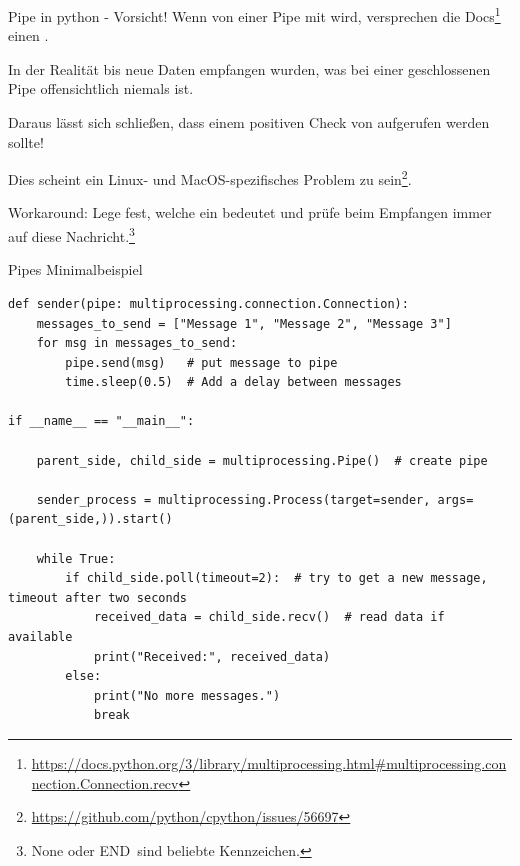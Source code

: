 \documentclass[12pt, aspectratio=169, usepdftitle=false, handout]{beamer}
\newcommand{\pp}[1]{\lpl{#1}}
\newcommand{\furl}[1]{\footnote{\url{#1}}}
\begin{document}
\begin{frame}[fragile]{Pipe in python - Vorsicht!}
	Wenn von einer  Pipe mit \pp{recv}  wird, versprechen die Docs\furl{https://docs.python.org/3/library/multiprocessing.html\#multiprocessing.connection.Connection.recv} einen \pp{EOFError}.
	
	\medskip
	
	In der Realität  \pp{recv} bis neue Daten empfangen wurden, was bei einer geschlossenen Pipe offensichtlich niemals ist.
	
	\medskip
	
	Daraus lässt sich schließen, dass \pp{recv}  einem positiven Check von  aufgerufen werden sollte!
	
	\medskip
	
	Dies scheint ein Linux- und MacOS-spezifisches Problem zu sein\furl{https://github.com/python/cpython/issues/56697}. 
	
	\medskip
	
	Workaround: Lege fest, welche  ein  bedeutet und prüfe beim Empfangen immer auf diese Nachricht.\footnote{None oder \glqq END\grqq~sind beliebte Kennzeichen.}
\end{frame}



\begin{frame}[fragile]{Pipes Minimalbeispiel}
	\begin{lstlisting}[language=pytiny]
def sender(pipe: multiprocessing.connection.Connection):
    messages_to_send = ["Message 1", "Message 2", "Message 3"]
    for msg in messages_to_send:
        pipe.send(msg)   # put message to pipe
        time.sleep(0.5)  # Add a delay between messages

if __name__ == "__main__":

    parent_side, child_side = multiprocessing.Pipe()  # create pipe

    sender_process = multiprocessing.Process(target=sender, args=(parent_side,)).start()

    while True:
        if child_side.poll(timeout=2):  # try to get a new message, timeout after two seconds
            received_data = child_side.recv()  # read data if available
            print("Received:", received_data)
        else:
            print("No more messages.")
            break
	\end{lstlisting}
\end{frame}
\end{document}
